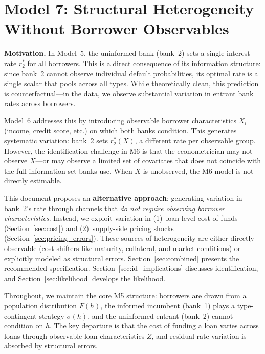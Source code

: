 \documentclass[12pt]{article}
\theoremstyle{plain}
\theoremstyle{plain}
\theoremstyle{definition}  %
\theoremstyle{remark}  %
\begin{document}
\section*{Model 7: Structural Heterogeneity Without Borrower Observables}

\textbf{Motivation.} In Model~5, the uninformed bank (bank~2) sets a single interest rate $r_2^*$ for all borrowers. This is a direct consequence of its information structure: since bank~2 cannot observe individual default probabilities, its optimal rate is a single scalar that pools across all types. While theoretically clean, this prediction is counterfactual---in the data, we observe substantial variation in entrant bank rates across borrowers.

Model~6 addresses this by introducing observable borrower characteristics $X_i$ (income, credit score, etc.) on which both banks condition. This generates systematic variation: bank~2 sets $r_2^*(X)$, a different rate per observable group. However, the identification challenge in M6 is that the econometrician may not observe $X$---or may observe a limited set of covariates that does not coincide with the full information set banks use. When $X$ is unobserved, the M6 model is not directly estimable.

This document proposes an \textbf{alternative approach}: generating variation in bank~2's rate through channels that \emph{do not require observing borrower characteristics}. Instead, we exploit variation in (1)~loan-level cost of funds (Section~\ref{sec:cost}) and (2)~supply-side pricing shocks (Section~\ref{sec:pricing_errors}). These sources of heterogeneity are either directly observable (cost shifters like maturity, collateral, and market conditions) or explicitly modeled as structural errors. Section~\ref{sec:combined} presents the recommended specification. Section~\ref{sec:id_implications} discusses identification, and Section~\ref{sec:likelihood} develops the likelihood.

Throughout, we maintain the core M5 structure: borrowers are drawn from a population distribution $F(h)$, the informed incumbent (bank~1) plays a type-contingent strategy $\sigma(h)$, and the uninformed entrant (bank~2) cannot condition on $h$. The key departure is that the cost of funding a loan varies across loans through observable loan characteristics $Z$, and residual rate variation is absorbed by structural errors.


\end{document}
